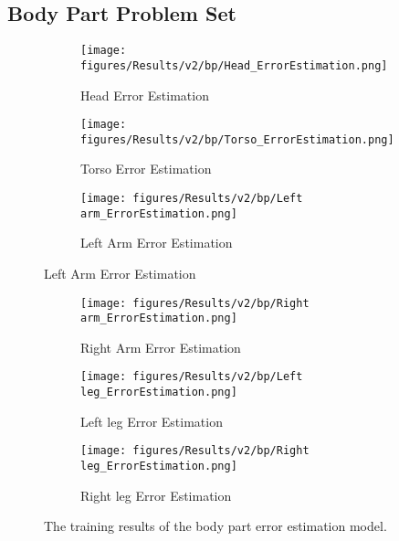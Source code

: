 \subsection{Body Part Problem Set}

\begin{figure}[ht]
  \centering
  \begin{subfigure}[b]{0.9\linewidth}
      \centering
      \texttt{[image: figures/Results/v2/bp/Head\_ErrorEstimation.png]}
      \caption{Head Error Estimation}
      \label{fig:head_lb_ee}
  \end{subfigure}
  \hfill
  \begin{subfigure}[b]{0.9\linewidth}
      \centering
      \texttt{[image: figures/Results/v2/bp/Torso\_ErrorEstimation.png]}
      \caption{Torso Error Estimation}
      \label{fig:torso_lb_ee}
  \end{subfigure}
  \hfill
  \begin{subfigure}[b]{0.9\linewidth}
      \centering
      \texttt{[image: figures/Results/v2/bp/Left arm\_ErrorEstimation.png]}
      \caption{Left Arm Error Estimation}
      \label{fig:lear_lb_ee}
  \end{subfigure}
\end{figure}


\begin{figure}[ht]
  \begin{subfigure}[b]{0.9\linewidth}
      \centering
      \texttt{[image: figures/Results/v2/bp/Right arm\_ErrorEstimation.png]}
      \caption{Right Arm Error Estimation}
      \label{fig:riar_lb_ee}
  \end{subfigure}
  \hfill
  \begin{subfigure}[b]{0.9\linewidth}
      \centering
      \texttt{[image: figures/Results/v2/bp/Left leg\_ErrorEstimation.png]}
      \caption{Left leg Error Estimation}
      \label{fig:lele_lb_ee}
  \end{subfigure}
  \hfill
  \begin{subfigure}[b]{0.9\linewidth}
      \centering
      \texttt{[image: figures/Results/v2/bp/Right leg\_ErrorEstimation.png]}
      \caption{Right leg Error Estimation}
      \label{fig:rileg_lb_ee}
  \end{subfigure}
  \hfill
  \caption[Limb model training results]{The training results of the body part error estimation model.}
  \label{fig:body part_training_results}
\end{figure}

